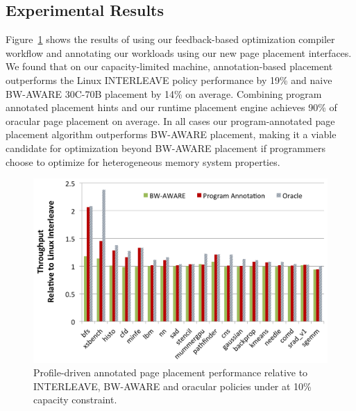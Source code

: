 \subsection{Experimental Results}
\label{results}

Figure~\ref{fig:annotated} shows the results of using our feedback-based
optimization compiler workflow and annotating our workloads using our new page
placement interfaces. We found that on our capacity-limited machine, 
annotation-based placement outperforms the Linux INTERLEAVE policy 
performance by 19\% and naive BW-AWARE 30C-70B placement by 14\%
on average.  Combining program annotated placement hints and our runtime placement engine 
achieves 90\% of oracular page placement on average.  In all cases
our program-annotated page placement algorithm outperforms BW-AWARE placement, making
it a viable candidate for optimization beyond BW-AWARE placement if programmers choose to
optimize for heterogeneous memory system properties.

\begin{figure}[t]
    \includegraphics[width=\columnwidth]{asplos2015/figures/appannotated-10per.png}
    \caption{Profile-driven annotated page placement performance relative to INTERLEAVE, BW-AWARE and oracular policies
    under at 10\% capacity constraint.}
    \label{fig:annotated}
\end{figure}

